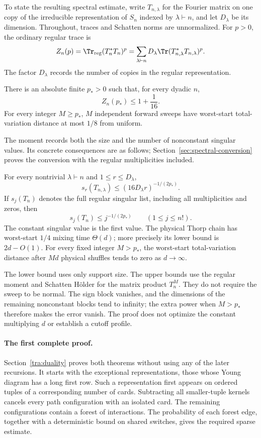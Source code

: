 To state the resulting spectral estimate, write $T_{n,\lambda}$ for the Fourier matrix on one copy of the irreducible representation of $S_n$ indexed by $\lambda\vdash n$, and let $D_\lambda$ be its dimension. Throughout, traces and Schatten norms are unnormalized. For $p>0$, the ordinary regular trace is
\[
 Z_n(p)=\Tr_{\mathrm{reg}}(T_n^*T_n)^p
       =\sum_{\lambda\vdash n}D_\lambda
                 \Tr(T_{n,\lambda}^*T_{n,\lambda})^p.
\]
The factor $D_\lambda$ records the number of copies in the regular representation.
\begin{theorem}\label{tra:duality:moment}
There is an absolute finite $p_*>0$ such that, for every dyadic $n$,
\begin{equation}\label{tra:duality:eq7}
 Z_n(p_*)\le1+\frac1{16}.
\end{equation}
For every integer $M\ge p_*$, $M$ independent forward sweeps have worst-start total-variation distance at most $1/8$ from uniform.
\end{theorem}
The moment records both the size and the number of nonconstant singular values. Its concrete consequences are as follows; Section~\ref{sec:spectral-conversion} proves the conversion with the regular multiplicities included.
\begin{corollary}\label{cor:intro-consequences}
For every nontrivial $\lambda\vdash n$ and $1\le r\le D_\lambda$,
\[
 s_r(T_{n,\lambda})\le(16D_\lambda r)^{-1/(2p_*)}.
\]
If $s_j(T_n)$ denotes the full regular singular list, including all multiplicities and zeros, then
\[
 s_j(T_n)\le j^{-1/(2p_*)}\qquad(1\le j\le n!).
\]
The constant singular value is the first value. The physical Thorp chain has worst-start $1/4$ mixing time $\Theta(d)$; more precisely its lower bound is $2d-O(1)$. For every fixed integer $M>p_*$, the worst-start total-variation distance after $Md$ physical shuffles tends to zero as $d\to\infty$.
\end{corollary}
The lower bound uses only support size. The upper bounds use the regular moment and Schatten H\"older for the matrix product $T_n^M$. They do not require the sweep to be normal. The sign block vanishes, and the dimensions of the remaining nonconstant blocks tend to infinity; the extra power when $M>p_*$ therefore makes the error vanish. The proof does not optimize the constant multiplying $d$ or establish a cutoff profile.

\paragraph{The first complete proof.}
Section~\ref{tra:duality} proves both theorems without using any of the later recursions. It starts with the exceptional representations, those whose Young diagram has a long first row. Such a representation first appears on ordered tuples of a corresponding number of cards. Subtracting all smaller-tuple kernels cancels every path configuration with an isolated card. The remaining configurations contain a forest of interactions. The probability of each forest edge, together with a deterministic bound on shared switches, gives the required sparse estimate.

